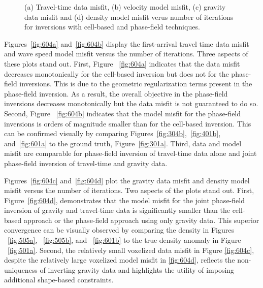 \documentclass[manuscript,revised]{geophysics}
\begin{document}
{\begin{figure}
\caption{(a) Travel-time data misfit, (b) velocity model misfit, (c) gravity data misfit and (d) density model misfit verus number of iterations for inversions with cell-based and phase-field techniques.}
\label{fig:604}
\end{figure}
}

Figures~\ref{fig:604a} and~\ref{fig:604b} display the first-arrival travel time data misfit and wave speed model misfit versus the number of iterations.  Three aspects of these plots stand out.  First, Figure ~\ref{fig:604a} indicates that the data misfit decreases monotonically for the cell-based inversion but does not for the phase-field inversions.  This is due to the geometric regularization terms present in the phase-field inversion.  As a result, the overall objective in the phase-field inversions decreases monotonically but the data misfit is not guaranteed to do so.   Second, Figure ~\ref{fig:604b} indicates that the model misfit for the phase-field inversions is orders of magnitude smaller than for the cell-based inversion. This can be confirmed visually by comparing Figures~\ref{fig:304b},~\ref{fig:401b}, and~\ref{fig:601a} to the ground truth, Figure~\ref{fig:301a}.  Third, data and model misfit are comparable for phase-field inversion of travel-time data alone and joint phase-field inversion of travel-time and gravity data.   

Figures~\ref{fig:604c} and~\ref{fig:604d} plot the gravity data misfit and density model misfit versus the number of iterations. Two aspects of the plots stand out.  First, Figure~\ref{fig:604d}, demonstrates that the model misfit for the joint phase-field inversion of gravity and travel-time data is significantly smaller than the cell-based approach or the phase-field approach using only gravity data. This superior convergence can be visually observed by comparing the density in Figures ~\ref{fig:505a}, ~\ref{fig:505b}, and ~\ref{fig:601b} to the true density anomaly in Figure ~\ref{fig:501a}. Second, the relatively small voxelized data misfit in Figure \ref{fig:604c}, despite the relatively large voxelized model misfit in \ref{fig:604d}, reflects the non-uniqueness of inverting gravity data and highlights the utility of imposing additional shape-based constraints.
\end{document}

